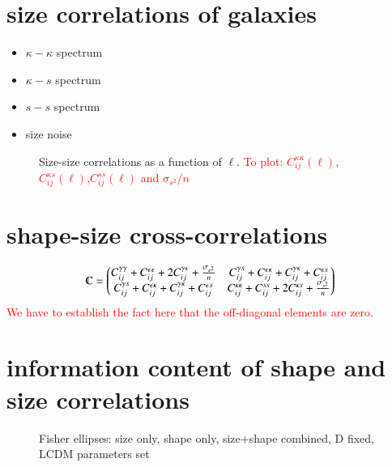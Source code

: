 \documentclass[a4paper,fleqn,usenatbib]{mnras}
\newcommand\BG[1]{\textcolor{red}{#1}}
\begin{document}
\section{size correlations of galaxies}\label{sect_sizes}
\begin{itemize}
    \item $\kappa-\kappa$ spectrum 
    \item $\kappa-s$ spectrum
    \item $s-s$ spectrum
    \item size noise
\end{itemize}


\begin{figure}
\centering
\caption{Size-size correlations as a function of $\ell$. \BG{To plot: $C_{ij}^{\kappa\kappa}(\ell)$,$C_{ij}^{\kappa s}(\ell)$,$C_{ij}^{ss}(\ell)$ and $\sigma_{s^2}/n$}}
\label{fig:shapeshape}
\end{figure}


\section{shape-size cross-correlations}\label{sect_cross}
$$\varmathbb{C}=\begin{pmatrix}
C_{ij}^{\gamma\gamma}+C_{ij}^{\epsilon\epsilon}+2C_{ij}^{\gamma\epsilon}+\frac{\sigma_{\epsilon^2}}{n} & C_{ij}^{\gamma s}+C_{ij}^{\epsilon\kappa}+C_{ij}^{\gamma\kappa}+C_{ij}^{\epsilon s}   \\
C_{ij}^{\gamma s}+C_{ij}^{\epsilon\kappa}+C_{ij}^{\gamma\kappa}+C_{ij}^{\epsilon s} & C_{ij}^{\kappa\kappa}+C_{ij}^{ss}+2C_{ij}^{\kappa s}+\frac{\sigma_{s^2}}{n}
\end{pmatrix}$$
\BG{We have to establish the fact here that the off-diagonal elements are zero.}



\section{information content of shape and size correlations}\label{sect_fisher}

\begin{figure}
\centering
\caption{Fisher ellipses: size only, shape only, size+shape combined, D fixed, LCDM parameters set}
\label{fig:fisher}
\end{figure}
\end{document}
